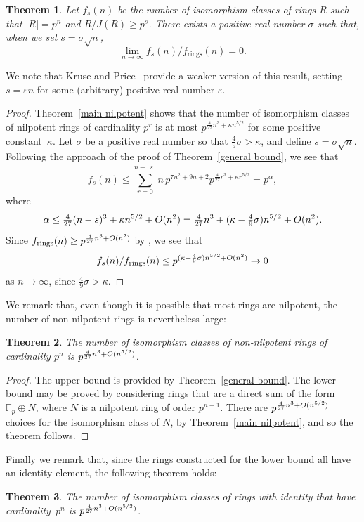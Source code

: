 \documentclass[12pt]{article}
\newtheorem{Thm}{Theorem}[section]
\newcommand{\Oh}{\mathnormal{O}}
\newcommand{\fr}{f_\mathrm{rings}}
\begin{document}
\begin{Thm} \label{not very nonnilpotent bound}
Let $f_s(n)$ be the number of isomorphism classes of rings $R$ such that $|R|=p^n$ and $R/J(R)\geq p^s$. 
There exists a positive real number $\sigma$ such that, when we set $s=\sigma \sqrt{n}$,
\[
\lim_{n\rightarrow\infty} f_{s}(n)/\fr(n)=0.
\]
\end{Thm}
We note that Kruse and Price~\cite[Theorem~5.10]{K & P} provide a weaker version of this result, setting $s=\varepsilon n$ for some (arbitrary) positive real number $\varepsilon$. 
\begin{proof}
Theorem~\ref{main nilpotent} shows that the number of isomorphism classes of nilpotent rings of cardinality $p^r$ is at most $p^{\frac{4}{27}n^{3} + \kappa n^{5/2}}$ for some positive constant~$\kappa$.
Let $\sigma$ be a positive real number so that $\frac{4}{9}\sigma>\kappa$, and define $s=\sigma\sqrt{n}$. Following the approach of the proof of Theorem~\ref{general bound}, we see that
\[
f_s(n)\leq\sum_{r=0}^{n-\lceil s\rceil} n\, p^{7n^2+9n+2} p^{\frac{4}{27}r^3+\kappa r^{5/2}}=p^\alpha,
\]
where
\[
\alpha\leq \tfrac{4}{27}(n-s)^3+\kappa n^{5/2}+\Oh(n^2)\\
=\tfrac{4}{27}n^3+(\kappa-\tfrac{4}{9}\sigma) n^{5/2}+\Oh(n^2).
\]
Since $\fr(n)\geq p^{\frac{4}{27}n^3+\Oh(n^2)}$ by \cite[Theorem~2.2]{K & P}, we see that
\[
f_s(n)/\fr(n)\leq p^{(\kappa-\frac{4}{9}\sigma)n^{5/2}+\Oh(n^2)}\rightarrow 0
\]
as $n\rightarrow\infty$, since $\frac{4}{9}\sigma>\kappa$.
\end{proof}

We remark that, even though it is possible that most rings are nilpotent, the number of non-nilpotent rings is nevertheless large:

\begin{Thm} \label{nonnilpotent bound}
The number of isomorphism classes of non-nilpotent rings of cardinality $p^{n}$ is $p^{\frac{4}{27}n^{3} + \Oh(n^{5/2})}$.
\end{Thm}
\begin{proof}
The upper bound is provided by Theorem~\ref{general bound}. The lower bound may be proved by considering rings that are a direct sum of the form $\mathbb{F}_p\oplus N$, where $N$ is a nilpotent ring of order $p^{n-1}$. There are $p^{\frac{4}{27}n^3+\Oh(n^{5/2})}$ choices for the isomorphism class of $N$, by Theorem~\ref{main nilpotent}, and so the theorem follows.
\end{proof}

Finally we remark that, since the rings constructed for the lower bound all have an identity element, the following theorem holds:
\begin{Thm} \label{ring with one bound}
The number of isomorphism classes of rings with identity that have cardinality~$p^{n}$ is $p^{\frac{4}{27}n^{3} + \Oh(n^{5/2})}$.
\end{Thm}
\end{document}
